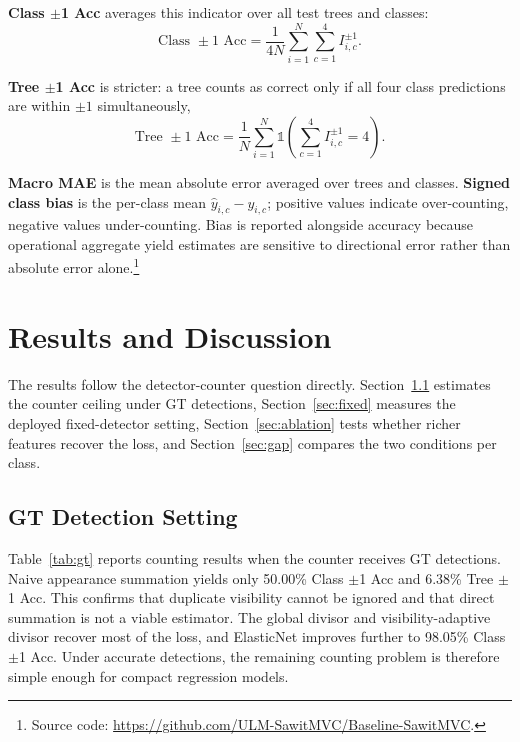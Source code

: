 ﻿\documentclass[conference]{IEEEtran}
\begin{document}
\textbf{Class $\pm$1 Acc} averages this indicator over all test trees and
classes:
\begin{equation}
  \text{Class } \pm 1 \text{ Acc} =
    \frac{1}{4N}\sum_{i=1}^{N}\sum_{c=1}^{4} I_{i,c}^{\pm 1}.
\end{equation}

\textbf{Tree $\pm$1 Acc} is stricter: a tree counts as correct only if all
four class predictions are within $\pm 1$ simultaneously,
\begin{equation}
  \text{Tree } \pm 1 \text{ Acc} =
    \frac{1}{N}\sum_{i=1}^{N}
      \mathbb{1}\!\left(\sum_{c=1}^{4} I_{i,c}^{\pm 1} = 4\right).
\end{equation}

\textbf{Macro MAE} is the mean absolute error averaged over trees and classes.
\textbf{Signed class bias} is the per-class mean $\hat{y}_{i,c} - y_{i,c}$;
positive values indicate over-counting, negative values under-counting. Bias
is reported alongside accuracy because operational aggregate yield estimates
are sensitive to directional error rather than absolute error alone.\footnote{Source code: \url{https://github.com/ULM-SawitMVC/Baseline-SawitMVC}.}

\section{Results and Discussion}

The results follow the detector-counter question directly. Section~\ref{sec:gt}
estimates the counter ceiling under GT detections, Section~\ref{sec:fixed}
measures the deployed fixed-detector setting, Section~\ref{sec:ablation} tests
whether richer features recover the loss, and Section~\ref{sec:gap} compares
the two conditions per class.

\subsection{GT Detection Setting}
\label{sec:gt}

Table~\ref{tab:gt} reports counting results when the counter receives GT
detections. Naive appearance summation yields only 50.00\% Class $\pm$1 Acc
and 6.38\% Tree $\pm$1 Acc. This confirms that duplicate visibility cannot be
ignored and that direct summation is not a viable estimator. The global divisor
and visibility-adaptive divisor recover most of the loss, and ElasticNet
improves further to 98.05\% Class $\pm$1 Acc. Under accurate detections, the
remaining counting problem is therefore simple enough for compact regression
models.
\end{document}

